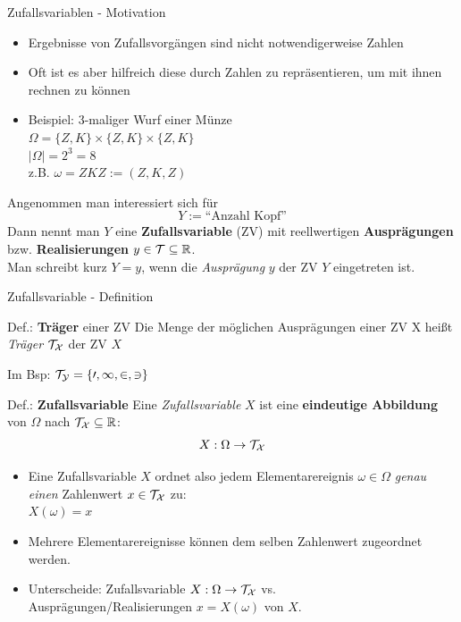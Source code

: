 \documentclass[
  10pt,
  ignorenonframetext,
]{beamer}
\providecommand{\tightlist}{%
  \setlength{\itemsep}{0pt}\setlength{\parskip}{0pt}}
\begin{document}
\begin{frame}{Zufallsvariablen - Motivation}
\protect\hypertarget{zufallsvariablen---motivation}{}
\begin{itemize}
\item
  Ergebnisse von Zufallsvorgängen sind nicht notwendigerweise Zahlen
\item
  Oft ist es aber hilfreich diese durch Zahlen zu repräsentieren, um mit
  ihnen rechnen zu können
\item
  Beispiel: 3-maliger Wurf einer Münze\\
  \(\Omega = \{Z, K\} \times \{Z, K\} \times \{Z, K\}\)\\
  \(|\Omega| = 2^3 = 8\)\\
  z.B. \(\omega = ZKZ := (Z,K,Z)\)
\end{itemize}

Angenommen man interessiert sich für \[Y:=\text{``Anzahl Kopf''}\] Dann
nennt man \(Y\) eine \textbf{Zufallsvariable} (ZV) mit reellwertigen
\textbf{Ausprägungen} bzw. \textbf{Realisierungen}
\(y \in \cal{T} \subseteq \mathbb R\).\\
Man schreibt kurz \(Y=y\), wenn die \emph{Ausprägung} \(y\) der ZV \(Y\)
eingetreten ist.
\end{frame}

\begin{frame}{Zufallsvariable - Definition}
\protect\hypertarget{zufallsvariable---definition}{}
\begin{block}{Def.: \textbf{Träger} einer ZV}
\protect\hypertarget{def.-truxe4ger-einer-zv}{}
Die Menge der möglichen Ausprägungen einer ZV X heißt \emph{Träger}
\(\cal{T}_X\) der ZV \(X\)
\end{block}

Im Bsp: \(\cal{T}_Y = \{0,1,2,3\}\)

\begin{block}{Def.: \textbf{Zufallsvariable}}
\protect\hypertarget{def.-zufallsvariable}{}
Eine \emph{Zufallsvariable} \(X\) ist eine \textbf{eindeutige Abbildung}
von \(\Omega\) nach \(\cal{T}_X \subseteq \mathbb{R}\):
\[X: \Omega \rightarrow \cal{T}_X\]
\end{block}

\begin{itemize}
\tightlist
\item
  Eine Zufallsvariable \(X\) ordnet also jedem Elementarereignis
  \(\omega \in \Omega\) \emph{genau einen} Zahlenwert
  \(x \in \cal{T}_X\) zu:\\
  \(X(\omega) = x\)
\item
  Mehrere Elementarereignisse können dem selben Zahlenwert zugeordnet
  werden.
\item
  Unterscheide: Zufallsvariable \(X:\Omega \to \cal{T}_X\) vs.\\
  Ausprägungen/Realisierungen \(x = X(\omega)\) von \(X\).
\end{itemize}

\end{frame}
\end{document}
